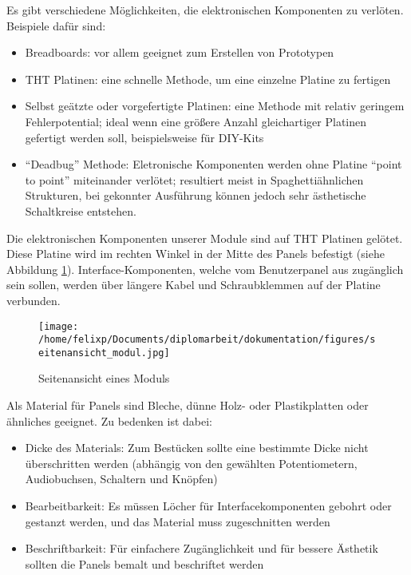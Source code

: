 \newpage

Es gibt verschiedene Möglichkeiten, die elektronischen Komponenten zu verlöten. Beispiele dafür sind:
\begin{itemize}
\item Breadboards:
vor allem geeignet zum Erstellen von Prototypen
\item \ac{THT} Platinen:
eine schnelle Methode, um eine einzelne Platine zu fertigen
\item Selbst geätzte oder vorgefertigte Platinen:
eine Methode mit relativ geringem Fehlerpotential; ideal wenn eine größere Anzahl gleichartiger Platinen gefertigt werden soll, beispielsweise für DIY-Kits
\item "`Deadbug"' Methode:
Eletronische Komponenten werden ohne Platine "`point to point"' miteinander verlötet; resultiert meist in Spaghettiähnlichen Strukturen, bei gekonnter Ausführung können jedoch sehr ästhetische Schaltkreise entstehen.
\end{itemize}

Die elektronischen Komponenten unserer Module sind auf \ac{THT} Platinen gelötet. Diese Platine wird im rechten Winkel in der Mitte des Panels befestigt (siehe Abbildung \ref{fig:org4e621d5}). Interface-Komponenten, welche vom Benutzerpanel aus zugänglich sein sollen, werden über längere Kabel und Schraubklemmen auf der Platine verbunden.

\begin{figure}[hb]
\centering
\texttt{[image: /home/felixp/Documents/diplomarbeit/dokumentation/figures/seitenansicht\_modul.jpg]}
\caption{\label{fig:org4e621d5}Seitenansicht eines Moduls}
\end{figure}

\newpage

Als Material für Panels sind Bleche, dünne Holz- oder Plastikplatten oder ähnliches geeignet. Zu bedenken ist dabei:

\begin{itemize}
\item Dicke des Materials:
Zum Bestücken sollte eine bestimmte Dicke nicht überschritten werden (abhängig von den gewählten Potentiometern, Audiobuchsen, Schaltern und Knöpfen)
\item Bearbeitbarkeit:
Es müssen Löcher für Interfacekomponenten gebohrt oder gestanzt werden, und das Material muss zugeschnitten werden
\item Beschriftbarkeit:
Für einfachere Zugänglichkeit und für bessere Ästhetik sollten die Panels bemalt und beschriftet werden
\end{itemize}

